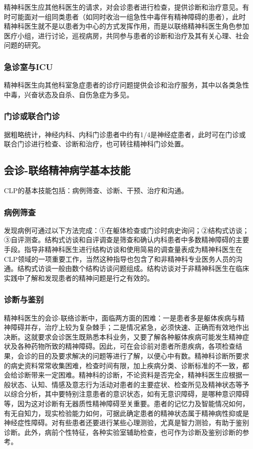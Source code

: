 精神科医生应其他科医生的请求，对会诊患者进行检查，提供诊断和治疗意见。有时可能面对一组同类患者（如同时收治一组急性中毒伴有精神障碍的患者），此时精神科医生就不是以患者为中心的方式发挥作用，而是以联络精神科医生角色参加医疗小组，进行讨论，巡视病房，共同参与患者的诊断和治疗及其有关心理、社会问题的研究。

\subsubsection{急诊室与ICU}

精神科医生向其他科室急症患者的诊疗问题提供会诊和治疗服务，其中以各类急性中毒，兴奋状态及自杀、自伤急症为多见。

\subsubsection{门诊或联合门诊}

据粗略统计，神经内科、内科门诊患者中约有1/4是神经症患者，此时可在门诊或联合门诊进行检查、诊断和治疗，也可转往精神科门诊处置。

\subsection{会诊-联络精神病学基本技能}

CLP的基本技能包括：病例筛查、诊断、干预、治疗和沟通。

\subsubsection{病例筛查}

发现病例可通过以下方法完成：①在躯体检查或门诊时病史询问；②结构式访谈；③自评测查。结构式访谈和自评调查是筛查和确认内科患者中多数精神障碍的主要手段。指导非精神科医生进行结构访谈和使用简易的调查量表成为精神科医生在CLP领域的一项重要工作，当然这种指导也包含了和非精神科专业医务人员的沟通。结构式访谈一般由数个结构访谈问题组成。结构访谈对于非精神科医生在临床实践中了解和发现患者的精神问题是行之有效的。

\subsubsection{诊断与鉴别}

精神科医生的会诊-联络诊断中，面临两方面的困难：一是患者多是躯体疾病与精神障碍并存，治疗上较为复杂棘手；二是情况紧急，必须快速、正确而有效地作出决断。这就要求会诊医生既熟悉本科业务，又要了解各种躯体疾病可能发生精神症状及各种药物所致的精神障碍。因此，可在会诊前对患者所患疾病，各项检查结果，会诊的目的及要求解决的问题等进行了解，以便心中有数。精神科诊断所要求的病史资料常常收集困难，检查时间有限，加上疾病分类、诊断标准的不一致，都会给诊断带来一定困难。精神科的诊断，不论资料是否完全，精神科医生应根据一般状态、认知、情感及意志行为活动对患者的主要症状、检查所见及精神状态等予以综合分析，其中要特别注意患者的意识状态，如有无意识障碍，是哪种意识障碍等，因为这对诊断有无器质性精神障碍至关重要。患者的记忆力及智能情况如何，有无自知力，现实检验能力如何，可据此确定患者的精神状态属于精神病性抑或是神经症性障碍。对有些患者还要进行某些心理测验，尤真是智力测验，有助于鉴别诊断。此外，病前个性特征，各种实验室辅助检查，也可作为诊断及鉴别诊断的参考。


